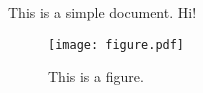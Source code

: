 \documentclass{article}
\begin{document}
This is a simple document. Hi!

\begin{figure}[htbp]
    \centering
    \texttt{[image: figure.pdf]}
    \caption{This is a figure.}
    \label{fig:a-figure}
\end{figure}
\end{document}
